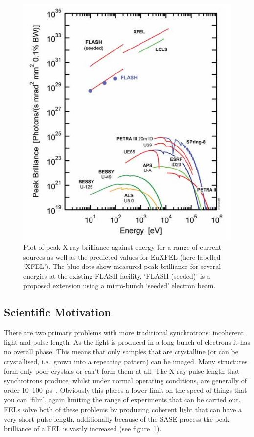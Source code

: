 \begin{figure}[htbp]
  \centering
    \includegraphics[width=.9\textwidth]{images/Other/XFEL-comparitive_energy-brightness.png}
  \caption{Plot of peak X-ray brilliance against energy for a range of current sources as well as the predicted values for EuXFEL (here labelled `XFEL'). The blue dots show measured peak brilliance for several energies at the existing FLASH facility, `FLASH (seeded)' is a proposed extension using a micro-bunch `seeded' electron beam.}
  \label{fig:xfel-brightness}
\end{figure}

\subsection{Scientific Motivation} %
\label{sub:scientific_motivation}
There are two primary problems with more traditional synchrotrons: incoherent light and pulse length. As the light is produced in a long bunch of electrons it has no overall phase. This means that only samples that are crystalline (or can be crystallised, i.e.\ grown into a repeating pattern) can be imaged. Many structures form only poor crystals or can't form them at all. The X-ray pulse length that synchrotrons produce, whilst under normal operating conditions, are generally of order 10--100~ps~\cite{xfel_detector_requirements}. Obviously this places a lower limit on the speed of things that you can `film', again limiting the range of experiments that can be carried out. FELs solve both of these problems by producing coherent light that can have a very short pulse length, additionally because of the SASE process the peak brilliance of a FEL is vastly increased (see figure~\ref{fig:xfel-brightness}).

